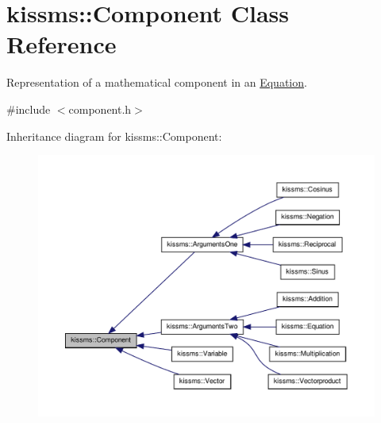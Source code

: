 \hypertarget{classkissms_1_1_component}{\section{kissms\-:\-:Component Class Reference}
\label{classkissms_1_1_component}
}


Representation of a mathematical component in an \hyperlink{classkissms_1_1_equation}{Equation}.  




{\ttfamily \#include $<$component.\-h$>$}



Inheritance diagram for kissms\-:\-:Component\-:
\nopagebreak
\begin{figure}[H]
\begin{center}
\leavevmode
\includegraphics[width=350pt]{classkissms_1_1_component__inherit__graph}
\end{center}
\end{figure}
